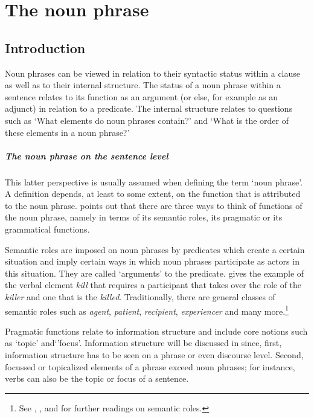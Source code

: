 \chapter{The noun phrase}
\label{sec:NP}

\section{Introduction}
\label{sec:NPIntro}


Noun phrases can be viewed in relation to their syntactic status within a clause as well as to their internal structure. The status of a noun phrase within a sentence relates to its function as an argument (or else, for example as an adjunct) in relation to a predicate. The internal structure relates to questions such as `What elements do noun phrases contain?' and `What is the order of these elements in a noun phrase?'  

\paragraph{The noun phrase on the sentence level} This latter perspective is usually assumed when defining the term `noun phrase'. A definition depends, at least to some extent, on the function that is attributed to the noun phrase. \citet[132]{andrews2007} points out that there are three ways to think of functions of the noun phrase, namely in terms of its semantic roles, its pragmatic or its grammatical functions.

Semantic roles are imposed on noun phrases by predicates which create a certain situation and imply certain ways in which noun phrases participate as actors in this situation. They are called `arguments' to the predicate. \citet[135]{andrews2007} gives the example of the verbal element {\itshape kill} that requires a participant that takes over the role of the {\itshape killer} and one that is the {\itshape killed}.  Traditionally, there are general classes of semantic roles such as {\itshape agent}, {\itshape patient}, {\itshape recipient}, {\itshape experiencer} and many more.\footnote{See \citet{jackendoff90}, \citet{andrews2007}, and \citet{levin2005} for further readings on semantic roles.} 

Pragmatic functions relate to information structure and include core notions such as `topic' and`'focus'. Information structure will be discussed in  since, first, information structure has to be seen on a phrase or even discourse level. Second, focussed or topicalized elements of a phrase exceed noun phrases; for instance, verbs can also be the topic or focus of a sentence.

